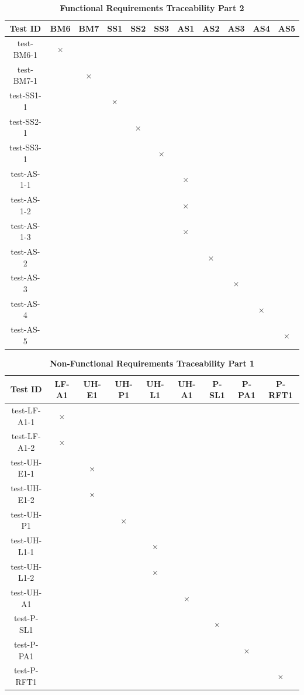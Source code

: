 \documentclass[12pt, titlepage]{article}
\begin{document}
\begin{table}[H]
\centering
\begin{tabular}{|c|c|c|c|c|c|c|c|c|c|c|}
\hline
Test ID & BM6 & BM7 & SS1 & SS2 & SS3 & AS1 & AS2 & AS3 & AS4 & AS5 \\
\hline 
test-BM6-1 & $\times$ & & & & & & & & & \\
test-BM7-1 & & $\times$ & & & & & & & & \\
test-SS1-1 & & & $\times$ & & & & & & & \\
test-SS2-1 & & & & $\times$ & & & & & & \\
test-SS3-1 & & & & & $\times$ & & & & & \\
test-AS-1-1 & & & & & &  $\times$ & & &  & \\
test-AS-1-2 & & & & & &  $\times$ & & &  & \\
test-AS-1-3 & & & & & &  $\times$ & & &  & \\
test-AS-2 & & & & & &   & $\times$ & &  & \\
test-AS-3 & & & & & & & & $\times$ &  & \\
test-AS-4 & & & & & & & & & $\times$ & \\
test-AS-5 & & & & & & & & & & $\times$ \\


\hline
\end{tabular}
\caption{\bf Functional Requirements Traceability Part 2}
\end{table}


\begin{table}[H]
\centering
\begin{tabular}{|c|c|c|c|c|c|c|c|c|}
\hline
Test ID & LF-A1 & UH-E1 & UH-P1 & UH-L1 & UH-A1 & P-SL1 & P-PA1 & P-RFT1 \\
\hline 
test-LF-A1-1 & $\times$ & & & & & & &   \\
test-LF-A1-2 & $\times$  & & & & & & &   \\
test-UH-E1-1 &  & $\times$  & & & & & &   \\
test-UH-E1-2 &  & $\times$  & & & & & &   \\
test-UH-P1 &  &  & $\times$  & & & & &   \\
test-UH-L1-1 &  & & & $\times$  & & & &   \\
test-UH-L1-2 &  & & & $\times$  & & & &   \\
test-UH-A1 &  &  & & & $\times$   & & &   \\
test-P-SL1 &  &  & & &    & $\times$ & &   \\
test-P-PA1 &  &  & & &    &  & $\times$ &   \\
test-P-RFT1 &  &  & & &    &  &  & $\times$  \\
\hline
\end{tabular}
\caption{\bf Non-Functional Requirements Traceability Part 1}
\end{table}
\end{document}
